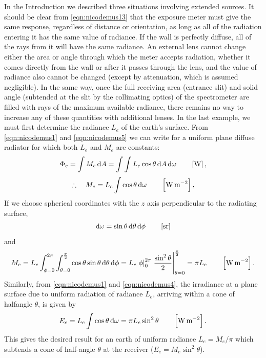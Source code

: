 In the Introduction we described three situations involving extended sources.
It should be clear from \cref{eqn:nicodemus13} that the exposure meter must
give the same response, regardless of distance or orientation, as long as all
of the radiation entering it has the same value of radiance. If the wall
is perfectly diffuse, all of the rays from it will have the same radiance.
An external lens cannot change either the area or angle through which the
meter accepts radiation, whether it comes directly from the wall or after it
passes through the lens, and the value of radiance also cannot be changed
(except by attenuation, which is assumed negligible). In the same way, once
the full receiving area (entrance slit) and solid angle (subtended at the
slit by the collimating optics) of the spectrometer are filled with rays of
the maximum available radiance, there remains no way to increase any of these
quantities with additional lenses. In the last example, we must first determine
the radiance $L_e$ of the earth’s surface.
From \cref{eqn:nicodemus1} and \cref{eqn:nicodemus5} we can write
for a uniform plane diffuse radiator for which both $L_e$ and $M_e$ are constants:
\begin{equation*}
\Phi_e = \int M_e \mathop{}\!\mathrm{d} A = \int \int L_e \cos\theta \mathop{}\!\mathrm{d} A \mathop{}\!\mathrm{d} \omega
\qquad \left[\si{\watt}\right],
\end{equation*}
\begin{equation}
\therefore\quad M_e = L_e \int \cos\theta \mathop{}\!\mathrm{d} \omega
\qquad \left[\si{\watt\per\square\meter}\right],
\end{equation}
If we choose spherical coordinates with the $z$ axis perpendicular to the
radiating surface,
\begin{equation*}
\d \omega = \sin\theta\d\theta \d \phi
\qquad \left[\si{\steradian}\right]
\end{equation*}
and
\begin{equation}
M_e = L_e \int_{\phi = 0}^{2\pi} \int_{\theta=0}^{\frac{\pi}{2}}\cos\theta
\sin\theta\d\theta \d\phi
= L_e \left.\phi\right|_{0}^{2\pi} \left.\frac{\sin^2\theta}{2}\right|_{\theta=0}^{\frac{\pi}{2}} = \pi L_e
\qquad \left[\si{\watt\per\square\meter}\right].
\end{equation}
Similarly, from \cref{eqn:nicodemus1} and \cref{eqn:nicodemus4},
the irradiance at a plane surface due to uniform radiation of radiance $L_e$,
arriving within a cone of halfangle $\theta$, is given by
\begin{equation}
E_e = L_e \int \cos\theta \mathop{}\!\mathrm{d}\omega = \pi L_e \sin^2\theta
\qquad \left[\si{\watt\per\square\meter}\right].
\end{equation}
This gives the desired result for an earth of uniform radiance
$L_e = M_e / \pi$ which subtends a cone of half-angle $\theta$ at the
receiver ($E_e = M_e \sin^2\theta$).

